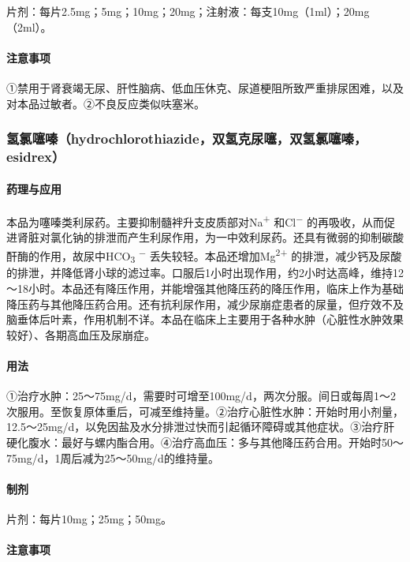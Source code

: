 片剂：每片2.5mg；5mg；10mg；20mg；注射液：每支10mg（1ml）；20mg（2ml）。

\paragraph{注意事项}

①禁用于肾衰竭无尿、肝性脑病、低血压休克、尿道梗阻所致严重排尿困难，以及对本品过敏者。②不良反应类似呋塞米。

\subsubsection{氢氯噻嗪（hydrochlorothiazide，双氢克尿噻，双氢氯噻嗪，esidrex）}

\paragraph{药理与应用}

本品为噻嗪类利尿药。主要抑制髓袢升支皮质部对Na\textsuperscript{+}
和Cl\textsuperscript{−}
的再吸收，从而促进肾脏对氯化钠的排泄而产生利尿作用，为一中效利尿药。还具有微弱的抑制碳酸酐酶的作用，故尿中HCO\textsubscript{3}
\textsuperscript{−} 丢失较轻。本品还增加Mg\textsuperscript{2+}
的排泄，减少钙及尿酸的排泄，并降低肾小球的滤过率。口服后1小时出现作用，约2小时达高峰，维持12～18小时。本品还有降压作用，并能增强其他降压药的降压作用，临床上作为基础降压药与其他降压药合用。还有抗利尿作用，减少尿崩症患者的尿量，但疗效不及脑垂体后叶素，作用机制不详。本品在临床上主要用于各种水肿（心脏性水肿效果较好）、各期高血压及尿崩症。

\paragraph{用法}

①治疗水肿：25～75mg/d，需要时可增至100mg/d，两次分服。间日或每周1～2次服用。至恢复原体重后，可减至维持量。②治疗心脏性水肿：开始时用小剂量，12.5～25mg/d，以免因盐及水分排泄过快而引起循环障碍或其他症状。③治疗肝硬化腹水：最好与螺内酯合用。④治疗高血压：多与其他降压药合用。开始时50～75mg/d，1周后减为25～50mg/d的维持量。

\paragraph{制剂}

片剂：每片10mg；25mg；50mg。

\paragraph{注意事项}

